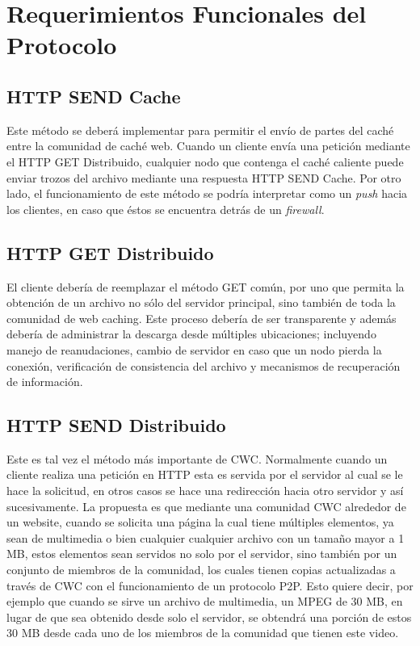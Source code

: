 \section{Requerimientos Funcionales del Protocolo}


\subsection{HTTP SEND Cache}
Este método se deberá implementar para permitir el envío de partes del caché entre la comunidad de caché web. Cuando un cliente envía una petición mediante el HTTP GET Distribuido, cualquier nodo que contenga el caché caliente puede enviar trozos del archivo mediante una respuesta HTTP SEND Cache. Por otro lado, el funcionamiento de este método se podría interpretar como un \textit{push} hacia los clientes, en caso que éstos se encuentra detrás de un \textit{firewall}. 

\subsection{HTTP GET Distribuido}
El cliente debería de reemplazar el método GET común, por uno que permita la obtención de un archivo no sólo del servidor principal, sino también de toda la comunidad de web caching. Este proceso debería de ser transparente y además debería de administrar la descarga desde múltiples ubicaciones; incluyendo manejo de reanudaciones, cambio de servidor en caso que un nodo pierda la conexión, verificación de consistencia del archivo y mecanismos de recuperación de información.

\subsection{HTTP SEND Distribuido}
Este es tal vez el método más importante de CWC. Normalmente cuando un cliente realiza una petición en HTTP esta es servida por el servidor al cual se le hace la solicitud, en otros casos se hace una redirección hacia otro servidor y así sucesivamente. La propuesta es que mediante una comunidad CWC alrededor de un website, cuando se solicita una página la cual tiene múltiples elementos, ya sean de multimedia o bien cualquier cualquier archivo con un tamaño mayor a 1 MB, estos elementos sean servidos no solo por el servidor, sino también por un conjunto de miembros de la comunidad, los cuales tienen copias actualizadas a través de CWC con el funcionamiento de un protocolo P2P. Esto quiere decir, por ejemplo que cuando se sirve un archivo de multimedia, un MPEG de 30 MB, en lugar de que sea obtenido desde solo el servidor, se obtendrá una porción de estos 30 MB desde cada uno de los miembros de la comunidad que tienen este video.

